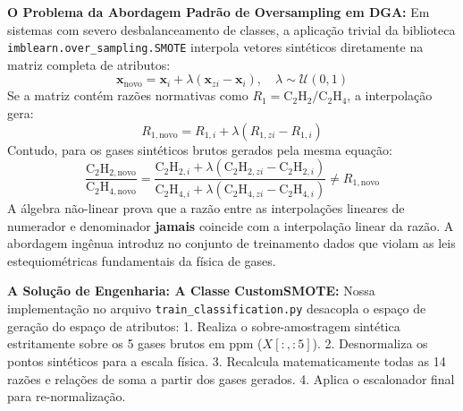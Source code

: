 \documentclass[10pt,a4paper]{article}
\begin{document}
\begin{defesabox}
\textbf{O Problema da Abordagem Padrão de Oversampling em DGA:}
Em sistemas com severo desbalanceamento de classes, a aplicação trivial da biblioteca \texttt{imblearn.over\_sampling.SMOTE} interpola vetores sintéticos diretamente na matriz completa de atributos:
$$\mathbf{x}_{\text{novo}} = \mathbf{x}_i + \lambda (\mathbf{x}_{zi} - \mathbf{x}_i), \quad \lambda \sim \mathcal{U}(0, 1)$$
Se a matriz contém razões normativas como $R_1 = \text{C}_2\text{H}_2/\text{C}_2\text{H}_4$, a interpolação gera:
$$R_{1,\text{novo}} = R_{1,i} + \lambda (R_{1,zi} - R_{1,i})$$
Contudo, para os gases sintéticos brutos gerados pela mesma equação:
$$\frac{\text{C}_2\text{H}_{2,\text{novo}}}{\text{C}_2\text{H}_{4,\text{novo}}} = \frac{\text{C}_2\text{H}_{2,i} + \lambda (\text{C}_2\text{H}_{2,zi} - \text{C}_2\text{H}_{2,i})}{\text{C}_2\text{H}_{4,i} + \lambda (\text{C}_2\text{H}_{4,zi} - \text{C}_2\text{H}_{4,i})} \neq R_{1,\text{novo}}$$
A álgebra não-linear prova que a razão entre as interpolações lineares de numerador e denominador \textbf{jamais} coincide com a interpolação linear da razão. A abordagem ingênua introduz no conjunto de treinamento dados que violam as leis estequiométricas fundamentais da física de gases.

\textbf{A Solução de Engenharia: A Classe CustomSMOTE:}
Nossa implementação no arquivo \texttt{train\_classification.py} desacopla o espaço de geração do espaço de atributos:
1. Realiza o sobre-amostragem sintética estritamente sobre os 5 gases brutos em ppm ($X[:, :5]$).
2. Desnormaliza os pontos sintéticos para a escala física.
3. Recalcula matematicamente todas as 14 razões e relações de soma a partir dos gases gerados.
4. Aplica o escalonador final para re-normalização.
\end{defesabox}
\end{document}
